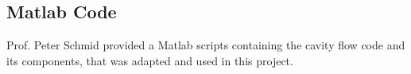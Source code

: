 \documentclass[11pt,a4paper,notitlepage]{article}
\begin{document}
\newpage
\begin{appendices}

\section*{Matlab Code}

%

















\end{appendices}


\begin{thebibliography}{9}


Prof. Peter Schmid provided a Matlab scripts containing the cavity flow code and its components, that was adapted and used in this project.

\end{thebibliography}
\end{document}
